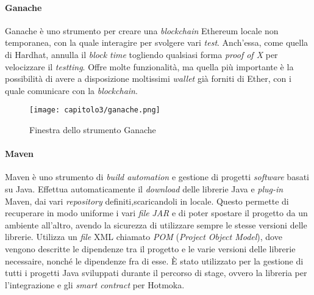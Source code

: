 \paragraph{Ganache}
Ganache è uno strumento per creare una \textit{blockchain} Ethereum locale non temporanea, con la quale interagire per svolgere vari \textit{test}. Anch'essa, come quella di Hardhat, annulla il \textit{block time} togliendo qualsiasi forma \textit{proof of X} per velocizzare il \textit{testting}. Offre molte funzionalità, ma quella più importante è la possibilità di avere a disposizione moltissimi \textit{wallet} già forniti di Ether, con i quale comunicare con la \textit{blockchain}.

\begin{figure}[h!]
  \centering
  \texttt{[image: capitolo3/ganache.png]}
  \caption{Finestra dello strumento Ganache}
\end{figure}

\paragraph{Maven}
Maven è uno strumento di \textit{build automation} e gestione di progetti \textit{software} basati su Java. Effettua automaticamente il \textit{download} delle librerie Java e \textit{plug-in} Maven, dai vari \textit{repository} definiti,scaricandoli in locale. Questo permette di recuperare in modo uniforme i vari \textit{file} \textit{JAR} e di poter spostare il progetto da un ambiente all'altro, avendo la sicurezza di utilizzare sempre le stesse versioni delle librerie. Utilizza un \textit{file} XML chiamato \textit{POM} (\textit{Project Object Model}), dove vengono descritte le dipendenze tra il progetto e le varie versioni delle librerie necessaire, nonché le dipendenze fra di esse. È stato utilizzato per la gestione di tutti i progetti Java sviluppati durante il percorso di stage, ovvero la libreria per l'integrazione e gli \textit{smart contract} per Hotmoka.


